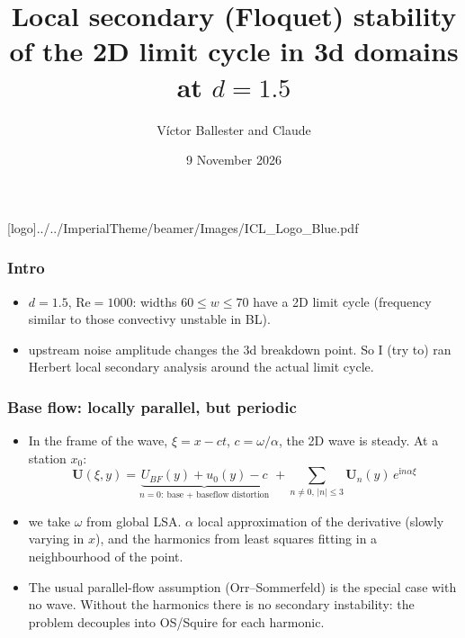\documentclass[
  aspectratio=169,
  t,
  onlytextwidth,
  10pt,
]{beamer}
\title{Local secondary (Floquet) stability of the 2D limit cycle in 3d domains at $d=1.5$}
\author{Víctor Ballester and Claude}
\date{9 November 2026}
\def\imagefolder{../../ImperialTheme/beamer/Images}
\def\Rey{\text{Re}}
\newcommand{\awave}{\alpha}
\newcommand{\bU}{\boldsymbol{U}}
\begin{document}
\begingroup
{}
[logo]{\imagefolder/ICL_Logo_Blue.pdf}
\frame[plain, s]{\titlepage}
\endgroup

\begin{frame}
	\frametitle{Intro}
	\begin{itemize}
		\item $d=1.5$, $\Rey=1000$: widths $60 \leq w\leq 70$ have a 2D limit cycle (frequency similar to those convectivy unstable in BL).
		\item upstream noise amplitude changes the 3d breakdown point. So I (try to) ran Herbert local secondary analysis around the actual limit cycle.
		\end{itemize}
\end{frame}

\begin{frame}
	\frametitle{Base flow: locally parallel, but periodic}
	\begin{itemize}
		\item In the frame of the wave, $\xi=x-ct$, $c=\omega/\awave$, the 2D wave is steady. At a station $x_0$:
		      \[
			      \bU(\xi,y)=\underbrace{U_{BF}(y)+u_0(y)-c}_{n=0:\ \text{base + baseflow distortion}}\;+\sum_{n\neq0,\,|n|\leq3}\bU_n(y)\,e^{\mathrm{i}n\awave\xi}
		      \]
		\item we take $\omega$ from global LSA. $\alpha$ local approximation of the derivative (slowly varying in $x$), and the harmonics from least squares fitting in a neighbourhood of the point.
		\item The usual parallel-flow assumption (Orr--Sommerfeld) is the special case with no wave. Without the harmonics there is no secondary instability: the problem decouples into OS/Squire for each harmonic.
	\end{itemize}
\end{frame}
\end{document}
